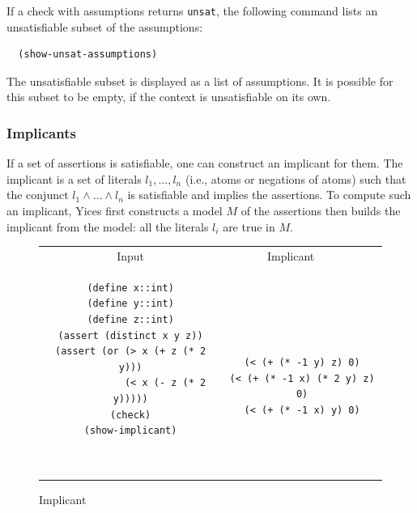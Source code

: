 \documentclass[11pt,twoside,fleqn,openright,titlepage]{cslreport}
\begin{document}
If a check with assumptions returns \texttt{unsat}, the following
command lists an unsatisfiable subset of the assumptions:
\begin{small}
\begin{verbatim}
  (show-unsat-assumptions)
\end{verbatim}
\end{small}

\medskip\noindent
The unsatisfiable subset is displayed as a list of assumptions. It is
possible for this subset to be empty, if the context is unsatisfiable
on its own.

\subsubsection*{Implicants}

If a set of assertions is satisfiable, one can construct an implicant
for them. The implicant is a set of literals $l_1,\ldots,l_n$ (i.e.,
atoms or negations of atoms) such that the conjunct $l_1 \wedge \ldots
\wedge l_n$ is satisfiable and implies the assertions. To compute such
an implicant, Yices first constructs a model $M$ of the assertions then
builds the implicant from the model: all the literals $l_i$ are
true in $M$.

\begin{figure}
\begin{footnotesize}
\begin{center}
\begin{tabular}{c|c}
\multicolumn{1}{c}{Input} & \multicolumn{1}{c}{Implicant~~~~} \\[0.4em]

\begin{minipage}[c]{6.2cm}
\begin{verbatim}
(define x::int)
(define y::int)
(define z::int)
(assert (distinct x y z))
(assert (or (> x (+ z (* 2 y)))
            (< x (- z (* 2 y)))))
(check)
(show-implicant)
\end{verbatim}
\end{minipage}~~
&
~~~\begin{minipage}[c]{6cm}
\begin{verbatim}
(< (+ (* -1 y) z) 0)
(< (+ (* -1 x) (* 2 y) z) 0)
(< (+ (* -1 x) y) 0)
\end{verbatim}
\end{minipage}
\end{tabular}
\end{center}
\end{footnotesize}
\caption{Implicant}
\label{implicant-format}
\end{figure}
\end{document}
